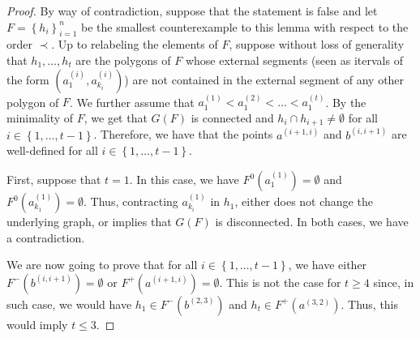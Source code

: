 \documentclass[12pt]{article}
\theoremstyle{definition}
\begin{document}
     \begin{proof}
         By way of contradiction,
         suppose that the statement is
         false and let
         $F = \left\{h_{i}\right\}_{i = 1}^{n}$ 
         be the smallest counterexample
         to this lemma with respect
         to the order $\prec$.
         Up to relabeling the elements
         of $F$, suppose without loss
         of generality that
         $h_{1}, \ldots, h_{t}$ are
         the polygons of $F$ whose
         external segments (seen as itervals
         of the form
         $\left(a_1^{\left(i\right)}, a_{k_{i}}^{\left(i\right)}\right)$) 
         are not contained
         in the external segment of 
         any other polygon of $F$.
         We further assume that
         $a_1^{\left(1\right)} <
         a_1^{\left(2\right)} < \ldots < 
         a_1^{\left(t\right)}$.
         By the minimality of $F$, we get
         that $G\left(F\right)$ is
         connected and $h_{i} \cap h_{i+1} \neq \emptyset$
         for all $i \in \left\{1, \ldots, t-1\right\}$.
         Therefore, we have that the points
         $a^{\left(i+1, i\right)}$ and
         $b^{\left(i, i+1\right)}$ are
         well-defined for all 
         $i \in \left\{1, \ldots, t-1\right\}$.

         First, suppose that $t = 1$.
         In this case, we have $F^{0}\left(a_1^{\left(1\right)}\right)
         = \emptyset$ and
         $F^{0}\left(a_{k_1}^{\left(1\right)}\right) = \emptyset$.
         Thus, contracting
         $a_{k_{i}}^{\left(1\right)}$ in $h_1$,
         either does not change the underlying graph,
         or implies that $G\left(F\right)$ is
         disconnected. In both cases, we have a contradiction.

         We are now going to prove that
         for all $i \in \left\{1, \ldots, t -1\right\}$,
         we have either $F^{-}\left(b^{\left(i, i+1\right)}\right)
         = \emptyset$ or 
         $F^{+}\left(a^{\left(i+1, i\right)}\right)
         = \emptyset$. This is
         not the case for $t \geq 4$ since,
         in such case, we would have 
         $h_1 \in F^{-}\left(b^{\left(2, 3\right)}\right)$
         and $h_{t} \in F^{+}\left(a^{\left(3, 2\right)}\right)$.
         Thus, this would imply $t \leq 3$.


\end{proof}
\end{document}
